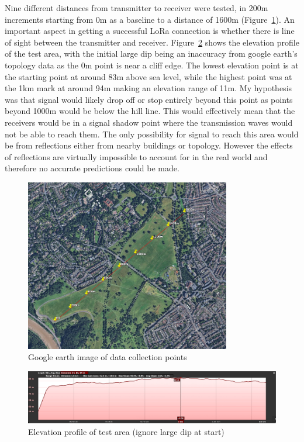 Nine different distances from transmitter to receiver were tested, in 200m
increments starting from 0m as a baseline to a distance of 1600m
(Figure~\ref{fig:range-test-markers}). An important aspect in getting a
successful LoRa connection is whether there is line of sight between the
transmitter and receiver. Figure~\ref{fig:range-test-elevation} shows the
elevation profile of the test area, with the initial large dip being an
inaccuracy from google earth's topology data as the 0m point is near a cliff
edge. The lowest elevation point is at the starting point at around 83m above
sea level, while the highest point was at the 1km mark at around 94m making an
elevation range of 11m. My hypothesis was that signal would likely drop off or
stop entirely beyond this point as points beyond 1000m would be below the hill
line. This would effectively mean that the receivers would be in a signal shadow
point where the transmission waves would not be able to reach them. The only
possibility for signal to reach this area would be from reflections either from
nearby buildings or topology. However the effects of reflections are virtually
impossible to account for in the real world and therefore no accurate
predictions could be made.

\begin{figure}[H]
    \centering
    \includegraphics[width=0.8\textwidth]{contents/part-2/fig2/range-test-markers.jpg}
    \caption{Google earth image of data collection points}
    \label{fig:range-test-markers}
\end{figure}


\begin{figure}[H]
    \centering
    \includegraphics[width=1\textwidth]{contents/part-2/fig2/range-test-elevation-profile.jpg}
    \caption{Elevation profile of test area (ignore large dip at start)}
    \label{fig:range-test-elevation}
\end{figure}

